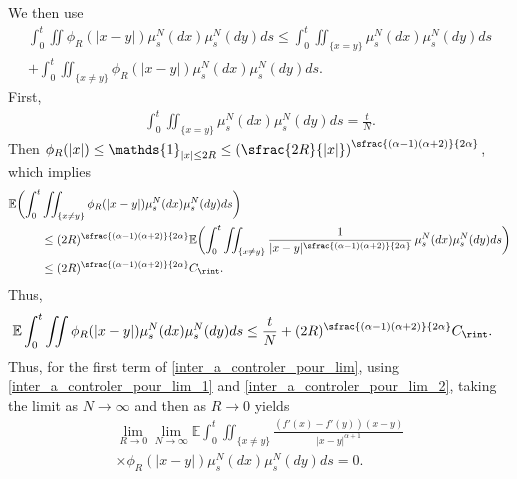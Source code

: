 We then use
\begin{multline*}
\int_{0}^t\iint\phi_R(|x-y|)\mu^N_s(dx)\mu^N_s(dy)ds
\leq \int_{0}^t\iint_{\{x=y\}}\mu^N_s(dx)\mu^N_s(dy)ds\\
+\int_{0}^t\iint_{\{x\neq y\}}\phi_R(|x-y|)\mu^N_s(dx)\mu^N_s(dy)ds.
\end{multline*}
First,
\begin{align*}
\int_{0}^t\iint_{\{x=y\}}\mu^N_s(dx)\mu^N_s(dy)ds=\frac{t}{N}.
\end{align*}
Then $\phi_R(|x|)\leq \mathds{1}_{|x|\leq2R}\leq\left(\sfrac{2R}{|x|}\right)^{\sfrac{(\alpha-1)(\alpha+2)}{2\alpha}}$,
which implies
\begin{align*}
\mathbb{E}\biggl(\int_{0}^t&\iint_{\{x\neq y\}}\phi_R(|x-y|)\mu^N_s(dx)\mu^N_s(dy)ds\biggr)\\
&\leq(2R)^{\sfrac{(\alpha-1)(\alpha+2)}{2\alpha}}\mathbb{E}\biggl(\int_{0}^t\iint_{\{x\neq y\}}\frac{1}{|x-y|^{\sfrac{(\alpha-1)(\alpha+2)}{2\alpha}}}\,\mu^N_s(dx)\mu^N_s(dy)ds\biggr)\\
&\leq (2R)^{\sfrac{(\alpha-1)(\alpha+2)}{2\alpha}}C_{\rint}.
\end{align*}
Thus,
\begin{align}
\mathbb{E}\int_{0}^t\iint\phi_R(|x-y|)\mu^N_s(dx)\mu^N_s(dy)ds&\leq \frac{t}{N}+(2R)^{\sfrac{(\alpha-1)(\alpha+2)}{2\alpha}}C_{\rint}\label{inter_a_controler_pour_lim_2}.
\end{align}
Thus, for the first term of \eqref{inter_a_controler_pour_lim}, using \eqref{inter_a_controler_pour_lim_1} and \eqref{inter_a_controler_pour_lim_2}, taking the limit as $N\to\infty$ and then as $R\to0$ yields
\begin{multline}\label{I_4_terme1}
\lim_{R\to0}\lim_{N\to\infty}
\mathbb{E}\int_{0}^t\iint_{\{x\neq y\}}\frac{(f'(x)-f'(y))(x-y)}{|x-y|^{\alpha+1}}\\
\times\phi_R(|x-y|)\mu^N_s(dx)\mu^N_s(dy)ds=0.
\end{multline}

